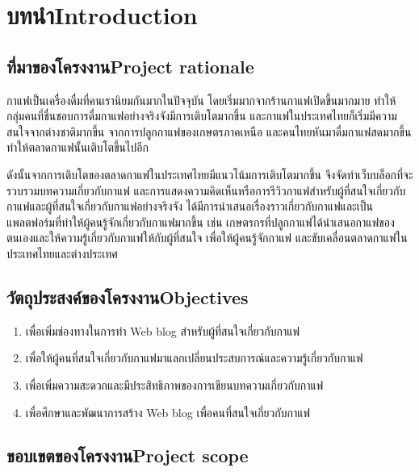 \chapter{\ifcpe บทนำ\else Introduction\fi}

\section{\ifcpe ที่มาของโครงงาน\else Project rationale\fi}

กาแฟเป็นเครื่องดื่มที่คนเรานิยมกันมากในปัจจุบัน โดยเริ่มมากจากร้านกาแฟเปิดขึ้นมากมาย ทำให้กลุ่มคนที่ชื่นชอบการดื่มกาแฟอย่างจริงจังมีการเติบโตมากขึ้น และกาแฟในประเทศไทยก็เริ่มมีความสนใจจากต่างชาติมากขึ้น จากการปลูกกาแฟของเกษตรภาคเหนือ และคนไทยหันมาดื่มกาแฟสดมากขึ้นทำให้ตลาดกาแฟนั้นเติบโตขึ้นไปอีก

ดังนั้นจากการเติบโตของตลาดกาแฟในประเทศไทยมีแนวโน้มการเติบโตมากขึ้น จึงจัดทำเว็บบล็อกที่จะรวบรวมบทความเกี่ยวกับกาแฟ และการแสดงความคิดเห็นหรือการรีวิวกาแฟสำหรับผู้ที่สนใจเกี่ยวกับกาแฟและผู้ที่สนใจเกี่ยวกับกาแฟอย่างจริงจัง ได้มีการนำเสนอเรื่องราวเกี่ยวกับกาแฟและเป็นแพลตฟอร์มที่ทำให้ผู้คนรู้จักเกี่ยวกับกาแฟมากขึ้น เช่น เกษตรกรที่ปลูกกาแฟได้นำเสนอกาแฟของตนเองและให้ความรู้เกี่ยวกับกาแฟให้กับผู้ที่สนใจ เพื่อให้ผู้คนรู้จักกาแฟ และขับเคลื่อนตลาดกาแฟในประเทศไทยและต่างประเทศ
\section{\ifcpe วัตถุประสงค์ของโครงงาน\else Objectives\fi}
\begin{enumerate}
    \item เพื่อเพิ่มช่องทางในการทำ Web blog สำหรับผู้ที่สนใจเกี่ยวกับกาแฟ
    \item เพื่อให้ผู้คนที่สนใจเกี่ยวกับกาแฟมาแลกเปลี่ยนประสบการณ์และความรู้เกี่ยวกับกาแฟ
    \item เพื่อเพิ่มความสะดวกและมีประสิทธิภาพของการเขียนบทความเกี่ยวกับกาแฟ
    \item เพื่อศึกษาและพัฒนาการสร้าง Web blog เพื่อคนที่สนใจเกี่ยวกับกาแฟ
\end{enumerate}

\section{\ifcpe ขอบเขตของโครงงาน\else Project scope\fi}

